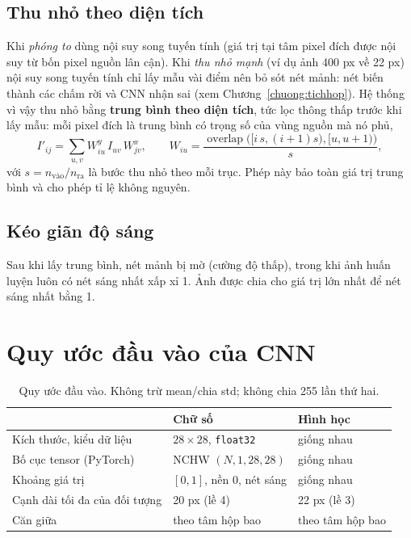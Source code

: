 \subsection{Thu nhỏ theo diện tích}
\label{muc:dientich}
Khi \emph{phóng to} dùng nội suy song tuyến tính (giá trị tại tâm pixel đích được nội suy từ bốn pixel nguồn lân cận). Khi \emph{thu nhỏ mạnh} (ví dụ ảnh 400 px về 22 px) nội suy song tuyến tính chỉ
lấy mẫu vài điểm nên bỏ sót nét mảnh: nét biến thành các chấm rời và CNN nhận sai (xem Chương~\ref{chuong:tichhop}). Hệ thống vì vậy thu nhỏ bằng \textbf{trung bình theo diện tích}, tức lọc thông thấp
trước khi lấy mẫu: mỗi pixel đích là trung bình có trọng số của vùng nguồn mà nó phủ,
\begin{equation}
I'_{ij}=\sum_{u,v} W^{y}_{iu}\,I_{uv}\,W^{x}_{jv},\qquad W_{iu}=\frac{\operatorname{overlap}\bigl([i\,s,(i{+}1)s),[u,u{+}1)\bigr)}{s},
\end{equation}
với $s=n_{\text{vào}}/n_{\text{ra}}$ là bước thu nhỏ theo mỗi trục. Phép này bảo toàn giá trị trung bình và cho phép tỉ lệ không nguyên.

\subsection{Kéo giãn độ sáng}
Sau khi lấy trung bình, nét mảnh bị mờ (cường độ thấp), trong khi ảnh huấn luyện luôn có nét sáng nhất xấp xỉ 1. Ảnh được chia cho giá trị lớn nhất để nét sáng nhất bằng 1.

\section{Quy ước đầu vào của CNN}
\begin{table}[H]\centering
\begin{tabular}{lll}
\toprule
 & Chữ số & Hình học \\
\midrule
Kích thước, kiểu dữ liệu & $28\times28$, \texttt{float32} & giống nhau \\
Bố cục tensor (PyTorch) & NCHW $(N, 1, 28, 28)$ & giống nhau \\
Khoảng giá trị & $[0,1]$, nền 0, nét sáng & giống nhau \\
Cạnh dài tối đa của đối tượng & 20 px (lề 4) & 22 px (lề 3) \\
Căn giữa & theo tâm hộp bao & theo tâm hộp bao \\
\bottomrule
\end{tabular}
\caption{Quy ước đầu vào. Không trừ mean/chia std; không chia 255 lần thứ hai.}
\end{table}

